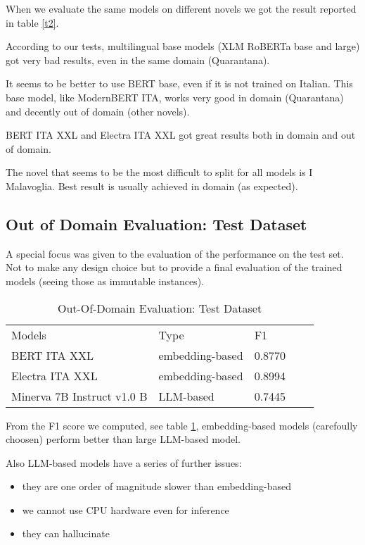 \documentclass[11pt]{article}
\begin{document}
When we evaluate the same models on different novels we got the
result reported in table \ref{t2}.

According to our tests, multilingual base models (XLM RoBERTa base and large)
got very bad results, even in the same domain (Quarantana).

It seems to be better to use BERT base, even if it is not trained on Italian.
This base model, like ModernBERT ITA, works very good in domain (Quarantana) and
decently out of domain (other novels).

BERT ITA XXL and Electra ITA XXL got great results both in domain and out of domain.

The novel that seems to be the most difficult to split for all models is I Malavoglia.
Best result is usually achieved in domain (as expected).

\subsection{Out of Domain Evaluation: Test Dataset}

A special focus was given to the evaluation of the performance on the test set.
Not to make any design choice but to provide a final evaluation of the 
trained models (seeing those as immutable instances).

\begin{table}[]
	\small
	\caption{Out-Of-Domain Evaluation: Test Dataset}
	\begin{tabular}{lllll}
		Models & Type & F1 \\
		BERT ITA XXL & embedding-based & 0.8770 \\
		Electra ITA XXL & embedding-based & 0.8994 \\
		Minerva 7B Instruct v1.0 B & LLM-based & 0.7445
	\end{tabular}
	\label{t3}
\end{table}

From the F1 score we computed, see table \ref{t3},
embedding-based models (carefoully choosen) perform better
than large LLM-based model.

Also LLM-based models have a series of further issues:

\begin{itemize}
 	\item they are one order of magnitude slower than embedding-based
	\item we cannot use CPU hardware even for inference
	\item they can hallucinate
\end{itemize}
\end{document}
